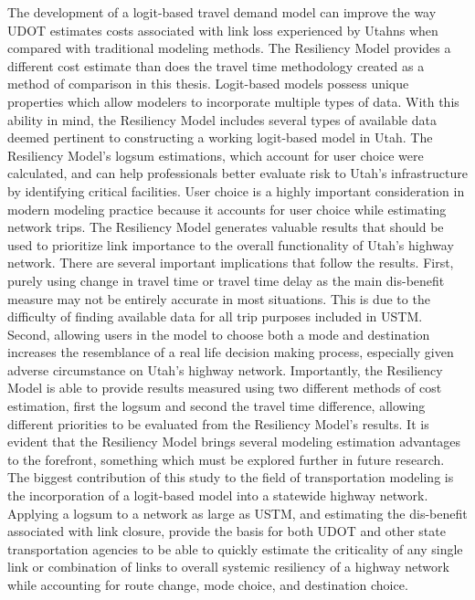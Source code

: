 The development of a logit-based travel demand model can improve the way UDOT
estimates costs associated with link loss experienced by Utahns when compared
with traditional modeling methods. The Resiliency Model provides a different cost
estimate than does the travel time methodology created as a method of comparison
in this thesis. Logit-based models possess unique properties which allow modelers
to incorporate multiple types of data. With this ability in mind, the Resiliency
Model includes several types of available data deemed pertinent to
constructing a working logit-based model in Utah. The Resiliency Model's
logsum estimations, which account for user choice were calculated, and can help
professionals better evaluate risk to Utah's infrastructure by identifying
critical facilities. User choice is a highly important consideration in modern modeling practice because it accounts for user choice while estimating
network trips. The Resiliency Model generates valuable results that should
be used to prioritize link importance to the overall functionality of Utah's
highway network. There are several important implications that follow the
results. First, purely
using change in travel time or travel time delay as the main dis-benefit measure may not
be entirely accurate in most situations. This is due to the difficulty of finding
available data for all trip purposes included in USTM. Second, allowing users in the model
to choose both a mode and destination increases the resemblance of a real life
decision making process, especially given adverse circumstance on Utah's
highway network. Importantly, the Resiliency Model is able to provide results measured
using two different methods of cost estimation, first the logsum and second the travel time difference,
allowing different priorities to be evaluated from the Resiliency Model's results.
It is evident that the Resiliency Model brings several
modeling estimation advantages to the forefront, something which must be
explored further in future research. The biggest contribution of this study to
the field of transportation modeling is the incorporation of a logit-based model
into a statewide highway network. Applying a logsum to a network as large as USTM, and
estimating the dis-benefit associated with link closure, provide the basis for both
UDOT and other state transportation agencies to be able to quickly estimate
the criticality of any single link or combination of links to overall systemic
resiliency of a highway network while accounting for route change, mode choice, and destination choice. 
